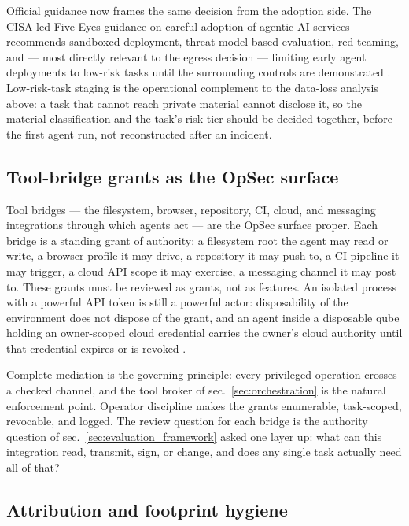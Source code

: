 \documentclass[
  english,
  9pt,
]{extarticle}
\begin{document}
Official guidance now frames the same decision from the adoption side.
The CISA-led Five Eyes guidance on careful adoption of agentic AI
services recommends sandboxed deployment, threat-model-based evaluation,
red-teaming, and --- most directly relevant to the egress decision ---
limiting early agent deployments to low-risk tasks until the surrounding
controls are demonstrated \citep{cisa_agentic_guidance}. Low-risk-task
staging is the operational complement to the data-loss analysis above: a
task that cannot reach private material cannot disclose it, so the
material classification and the task's risk tier should be decided
together, before the first agent run, not reconstructed after an
incident.

\subsection{Tool-bridge grants as the OpSec
surface}\label{tool-bridge-grants-as-the-opsec-surface}

Tool bridges --- the filesystem, browser, repository, CI, cloud, and
messaging integrations through which agents act --- are the OpSec
surface proper. Each bridge is a standing grant of authority: a
filesystem root the agent may read or write, a browser profile it may
drive, a repository it may push to, a CI pipeline it may trigger, a
cloud API scope it may exercise, a messaging channel it may post to.
These grants must be reviewed as grants, not as features. An isolated
process with a powerful API token is still a powerful actor:
disposability of the environment does not dispose of the grant, and an
agent inside a disposable qube holding an owner-scoped cloud credential
carries the owner's cloud authority until that credential expires or is
revoked \citep{qubes_disposables}.

Complete mediation \citep{saltzer1975} is the governing principle: every
privileged operation crosses a checked channel, and the tool broker of
sec.~\ref{sec:orchestration} is the natural enforcement point. Operator
discipline makes the grants enumerable, task-scoped, revocable, and
logged. The review question for each bridge is the authority question of
sec.~\ref{sec:evaluation_framework} asked one layer up: what can this
integration read, transmit, sign, or change, and does any single task
actually need all of that?

\subsection{Attribution and footprint
hygiene}\label{attribution-and-footprint-hygiene}
\end{document}
